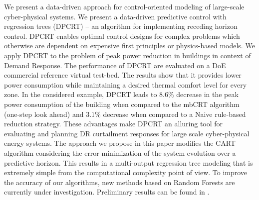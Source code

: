 We present a data-driven approach for control-oriented modeling of large-scale cyber-physical systems. 
We present a data-driven predictive control with regression trees (DPCRT) -- an algorithm for implementing receding horizon control. 
DPCRT enables optimal control designs for complex problems which otherwise are dependent on expensive first principles or physics-based models. 
We apply DPCRT to the problem of peak power reduction in buildings in context of Demand Response. 
The performance of DPCRT are evaluated on a DoE commercial reference virtual test-bed. 
The results show that it provides lower power consumption while maintaining a desired thermal comfort level for every zone.
In the considered example, DPCRT leads to $8.6\%$ decrease in the peak power consumption of the building when compared to the mbCRT algorithm (one-step look ahead) and $3.1\%$ decrease when compared to a Naive rule-based reduction strategy. 
These advantages make DPCRT an alluring tool for evaluating and planning DR curtailment responses for large scale cyber-physical energy systems.
The approach we propose in this paper modifies the CART algorithm considering the error minimization of the system evolution over a predictive horizon. 
This results in a multi-output regression tree modeling that is extremely simple from the computational complexity point of view. 
To improve the accuracy of our algorithms, new methods based on Random Forests are currently under investigation. Preliminary results can be found in \cite{JainACC2017,JainCDC2017}.
